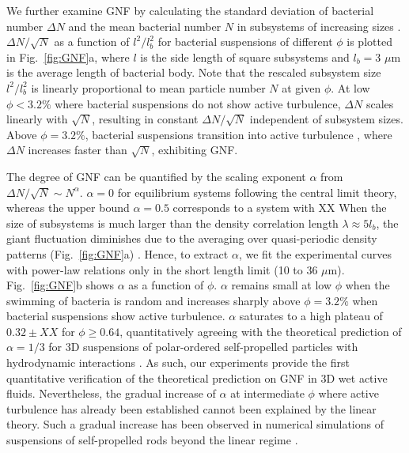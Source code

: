 \documentclass[twocolumn,aps,prl,amsmath,amssymb,longbibliography]{revtex4-2}
\begin{document}
We further examine GNF by calculating the standard deviation of bacterial number $\Delta N$ and the mean bacterial number $N$ in subsystems of increasing sizes \cite{Liu2020}. $\Delta N / \sqrt N$ as a function of $l^2/l_b^2$ for bacterial suspensions of different $\phi$ is plotted in Fig.~\ref{fig:GNF}a, where $l$ is the side length of square subsystems and $l_b=3$ $\mu$m is the average length of bacterial body. Note that the rescaled subsystem size $l^2/l_b^2$ is linearly proportional to mean particle number $N$ at given $\phi$.
At low $\phi<3.2\%$ where bacterial suspensions do not show active turbulence, $\Delta N$ scales linearly with $\sqrt N$, resulting in constant $\Delta N / \sqrt N$ independent of subsystem sizes. Above $\phi=3.2\%$, bacterial suspensions transition into active turbulence \cite{Peng2020}, where $\Delta N$ increases faster than $\sqrt N$, exhibiting GNF.

The degree of GNF can be quantified by the scaling exponent $\alpha$ from $\Delta N/\sqrt{N} \sim N^\alpha$. $\alpha=0$ for equilibrium systems following the central limit theory, whereas the upper bound $\alpha = 0.5$ corresponds to a system with XX
When the size of subsystems is much larger than the density correlation length $\lambda \approx 5l_b$, the giant fluctuation diminishes due to the averaging over quasi-periodic density patterns (Fig.~\ref{fig:GNF}a) \cite{Saintillan2012}.
Hence, to extract $\alpha$, we fit the experimental curves with power-law relations only in the short length limit (10 to 36 $\mu$m). Fig.~\ref{fig:GNF}b shows $\alpha$ as a function of $\phi$. $\alpha$ remains small at low $\phi$ when the swimming of bacteria is random and increases sharply above $\phi = 3.2\%$ when bacterial suspensions show active turbulence.
$\alpha$ saturates to a high plateau of $0.32 \pm XX$ for $\phi \geq 0.64$, quantitatively agreeing with the theoretical prediction of $\alpha = 1/3$ for 3D suspensions of polar-ordered self-propelled particles with hydrodynamic interactions \cite{AditiSimha2002}. As such, our experiments provide the first quantitative verification of the theoretical prediction on GNF in 3D wet active fluids. Nevertheless, the gradual increase of $\alpha$ at intermediate $\phi$ where active turbulence has already been established cannot been explained by the linear theory. Such a gradual increase has been observed in numerical simulations of suspensions of self-propelled rods beyond the linear regime \cite{Saintillan2012}.
\end{document}
